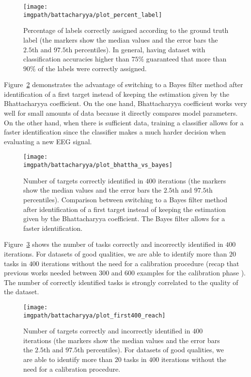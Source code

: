 \begin{figure}[!ht]
    \centering
        \texttt{[image: \\imgpath/battacharyya/plot\_percent\_label]}
        \caption{Percentage of labels correctly assigned according to the ground truth label (the markers show the median values and the error bars the $2.5$th and $97.5$th percentiles). In general, having dataset with classification accuracies higher than $75\%$ guaranteed that more than $90\%$ of the labels were correctly assigned.}
        \label{fig:percentageLabels}
\end{figure}

Figure~\ref{fig:bhatta} demonstrates the advantage of switching to a Bayes filter method after identification of a first target instead of keeping the estimation given by the Bhattacharyya coefficient. On the one hand, Bhattacharyya coefficient works very well for small amounts of data because it directly compares model parameters. On the other hand, when there is sufficient data, training a classifier allows for a faster identification since the classifier makes a much harder decision when evaluating a new EEG signal.

\begin{figure}[!ht]
    \centering
        \texttt{[image: \\imgpath/battacharyya/plot\_bhattha\_vs\_bayes]}
        \caption{Number of targets correctly identified in $400$ iterations (the markers show the median values and the error bars the $2.5$th and $97.5$th percentiles). Comparison between switching to a Bayes filter method after identification of a first target instead of keeping the estimation given by the Bhattacharyya coefficient. The Bayes filter allows for a faster identification.}
        \label{fig:bhatta}
\end{figure} 

Figure~\ref{fig:avg_sum_400} shows the number of tasks correctly and incorrectly identified in $400$ iterations. For datasets of good qualities, we are able to identify more than $20$ tasks in $400$ iterations without the need for a calibration procedure (recap that previous works needed between 300 and 600 examples for the calibration phase \cite{chavarriaga2010learning,iturrate2010single}). The number of correctly identified tasks is strongly correlated to the quality of the dataset.

\begin{figure}[!ht]
    \centering
    \texttt{[image: \\imgpath/battacharyya/plot\_first400\_reach]} 
    \caption{Number of targets correctly and incorrectly identified in $400$ iterations (the markers show the median values and the error bars the $2.5$th and $97.5$th percentiles). For datasets of good qualities, we are able to identify more than $20$ tasks in $400$ iterations without the need for a calibration procedure.}
    \label{fig:avg_sum_400}
\end{figure} 

